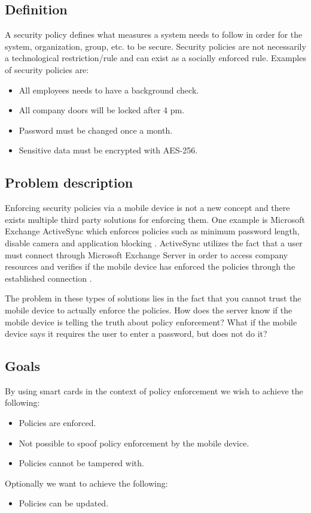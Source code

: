\subsection{Definition}
A security policy defines what measures a system needs to follow in order for the system, organization, group, etc. to be secure. Security policies are not necessarily a technological restriction/rule and can exist as a socially enforced rule. Examples of security policies are:
\begin{itemize}
  \item All employees needs to have a background check.
  \item All company doors will be locked after 4 pm.
  \item Password must be changed once a month.
  \item Sensitive data must be encrypted with AES-256.
\end{itemize}

\subsection{Problem description}
Enforcing security policies via a mobile device is not a new concept and there exists multiple third party solutions for enforcing them. One example is Microsoft Exchange ActiveSync which enforces policies such as minimum password length, disable camera and application blocking \cite{exchangePolicies}. ActiveSync utilizes the fact that a user must connect through Microsoft Exchange Server in order to access company resources and verifies if the mobile device has enforced the policies through the established connection \cite{exchangePoliciesTech}.

The problem in these types of solutions lies in the fact that you cannot trust the mobile device to actually enforce the policies. How does the server know if the mobile device is telling the truth about policy enforcement? What if the mobile device says it requires the user to enter a password, but does not do it?

\subsection{Goals}
By using smart cards in the context of policy enforcement we wish to achieve the following:
\begin{itemize}
  \item Policies are enforced.
  \item Not possible to spoof policy enforcement by the mobile device.
  \item Policies cannot be tampered with.
\end{itemize}
Optionally we want to achieve the following:
\begin{itemize}
  \item Policies can be updated.
\end{itemize}


